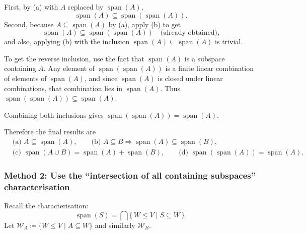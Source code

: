\documentclass[12pt]{article}
\newcommand{\Span}{\operatorname{span}}
\begin{document}
\begin{enumerate}[label=(\alph*)]
First, by (a) with \(A\) replaced by \(\Span(A)\),
\[
\Span(A)\subseteq \Span(\Span(A)).
\]
Second, because \(A\subseteq \Span(A)\) by (a), apply (b) to get
\[
\Span(A)\subseteq \Span(\Span(A))\quad\text{(already obtained),}
\]
and also, applying (b) with the inclusion \(\Span(A)\subseteq \Span(A)\) is trivial.

To get the reverse inclusion, use the fact that \(\Span(A)\) is a subspace containing \(A\).
Any element of \(\Span(\Span(A))\) is a finite linear combination of elements of \(\Span(A)\), and since \(\Span(A)\) is closed under linear combinations, that combination lies in \(\Span(A)\).
Thus \(\Span(\Span(A))\subseteq \Span(A)\).

Combining both inclusions gives \(\Span(\Span(A))=\Span(A)\).
\end{enumerate}

Therefore the final results are
\[
\boxed{
\begin{aligned}
&\text{(a) }A\subseteq \Span(A),\qquad
\text{(b) }A\subseteq B\Rightarrow \Span(A)\subseteq \Span(B),\\
&\text{(c) }\Span(A\cup B)=\Span(A)+\Span(B),\qquad
\text{(d) }\Span(\Span(A))=\Span(A).
\end{aligned}}
\]

\subsubsection{Method 2: Use the ``intersection of all containing subspaces'' characterisation}
Recall the characterisation:
\[
\Span(S)=\bigcap\{\,W\le V \mid S\subseteq W\,\}.
\]
Let \(\mathcal{W}_A\coloneqq \{W\le V\mid A\subseteq W\}\) and similarly \(\mathcal{W}_B\).
\end{document}
